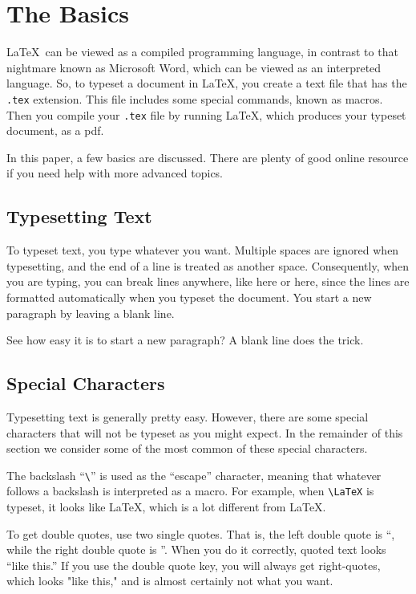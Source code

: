\chapter{The Basics}

\LaTeX\ can be viewed
as a compiled programming language, in contrast to that 
nightmare known as Microsoft Word,
which can be viewed as an interpreted language. So, to typeset a
document in \LaTeX, you create a text file that has the {\tt .tex} extension.
This file includes some special
commands, known as macros. Then
you compile your {\tt .tex} file by running  \LaTeX,
which produces your typeset document, as a pdf. 

In this paper, a few basics are discussed. There are plenty of good online resource
if you need help with more advanced topics.


\section{Typesetting Text} 

To typeset text, you type whatever you want. Multiple spaces are
ignored                           when typesetting, and
the end of a line is treated as another space.
Consequently, when you are typing, you can break lines anywhere, like here
or here,
since the lines are formatted automatically when you typeset the document.
You start a new paragraph by leaving a blank line.

See how easy it is to start a new paragraph? A blank line does the trick.


\section{Special Characters}

Typesetting text is generally pretty easy. However, there are some special
characters that will not be typeset as you might expect. In the remainder of this
section we consider some of the most common of these
special characters. 

The backslash ``\verb+\+'' is used 
as the ``escape'' character, meaning that
whatever follows a backslash is interpreted as a macro.
For example, when \verb+\LaTeX+ is typeset, it looks like \LaTeX, which 
is a lot different from LaTeX.

To get double quotes, use two single quotes. That is, the left double quote is ``, while the right double
quote is ''. When you do it correctly, quoted text looks ``like this.''
If you use the double quote key, you will always get right-quotes, which looks "like this," and is
almost certainly not what you want.

